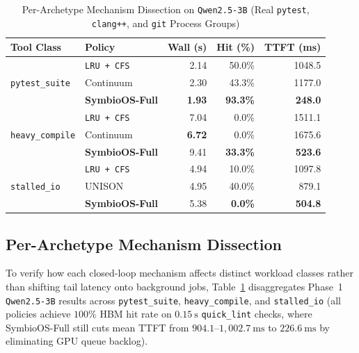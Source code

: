 \documentclass[10pt,journal,compsoc]{IEEEtran}
\theoremstyle{definition}
\theoremstyle{remark}
\newcommand{\SymbioFull}{\textup{\textsc{SymbioOS-Full}}}
\newcommand{\Continuum}{\textup{\textsc{Continuum}}}
\newcommand{\UNISON}{\textup{\textsc{UNISON}}}
\def\SymbioFull{SymbioOS-Full}%
\def\Continuum{Continuum}%
\def\UNISON{UNISON}%
\begin{document}
\begin{itemize}
\end{itemize}

\begin{table}[!t]
\centering
\caption{Per-Archetype Mechanism Dissection on \texttt{Qwen2.5-3B} (Real \texttt{pytest}, \texttt{clang++}, and \texttt{git} Process Groups)}
\label{tab:archetype}
\footnotesize
\setlength{\tabcolsep}{2.6pt}
\begin{tabular}{llrrr}
\toprule
\textbf{Tool Class} & \textbf{Policy} & \textbf{Wall (s)} & \textbf{Hit (\%)} & \textbf{TTFT (ms)} \\
\midrule
\multirow{3}{*}{\texttt{pytest\_suite}}
 & \texttt{LRU + CFS} & 2.14 & 50.0\% & 1048.5 \\
 & \Continuum{} & 2.30 & 43.3\% & 1177.0 \\
 & \textbf{\SymbioFull{}} & \textbf{1.93} & \textbf{93.3\%} & \textbf{248.0} \\
\midrule
\multirow{3}{*}{\texttt{heavy\_compile}}
 & \texttt{LRU + CFS} & 7.04 & 0.0\% & 1511.1 \\
 & \Continuum{} & \textbf{6.72} & 0.0\% & 1675.6 \\
 & \textbf{\SymbioFull{}} & 9.41 & \textbf{33.3\%} & \textbf{523.6} \\
\midrule
\multirow{3}{*}{\texttt{stalled\_io}}
 & \texttt{LRU + CFS} & 4.94 & 10.0\% & 1097.8 \\
 & \UNISON{} & 4.95 & 40.0\% & 879.1 \\
 & \textbf{\SymbioFull{}} & 5.38 & \textbf{0.0\%} & \textbf{504.8} \\
\bottomrule
\end{tabular}
\end{table}

\subsection{Per-Archetype Mechanism Dissection}
To verify how each closed-loop mechanism affects distinct workload classes rather than shifting tail latency onto background jobs, Table~\ref{tab:archetype} disaggregates Phase~1 \texttt{Qwen2.5-3B} results across \texttt{pytest\_suite}, \texttt{heavy\_compile}, and \texttt{stalled\_io} (all policies achieve $100\%$ HBM hit rate on $0.15~\mathrm{s}$ \texttt{quick\_lint} checks, where \SymbioFull{} still cuts mean TTFT from $904.1$--$1{,}002.7~\mathrm{ms}$ to $226.6~\mathrm{ms}$ by eliminating GPU queue backlog).
\end{document}
